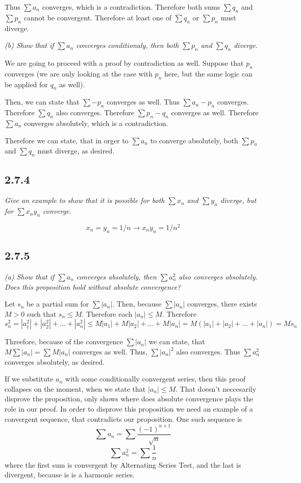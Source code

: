 \documentclass[11pt,oneside,titlepage]{book}
\begin{document}
Thus $\sum a_n$ converges, which is a contradiction. Therefore both
sums $\sum q_n$ and $\sum p_n$ cannot be convergent. Therefore at least one of
$\sum q_n$ or $\sum p_n$ must diverge.

\textit{(b) Show that if $\sum a_n$ converges conditionaly, then both
  $\sum p_n$ and $\sum q_n$ diverge.}

We are going to proceed with a proof by contradiction as well. Suppose that
$p_n$ converges (we are only looking at the case with $p_n$ here, but the
same logic can be applied for $q_n$ as well).

Then, we can state that $\sum -p_n$ converges as well. Thus $\sum a_n - p_n$
converges. Therefore $\sum q_n$ also converges. Therefore $\sum p_n - q_n$
converges as well. Therefore $\sum a_n$ converges absolutely, which is a
contradiction.

Therefore we can state, that in orger to $\sum a_n$ to converge absolutely,
both $\sum p_n$ and $\sum q_n$ must diverge, as desired.

\subsection*{2.7.4}
\textit{Give an example to show that it is possible for both $\sum x_n$ and
  $\sum y_n$ diverge, but for $\sum x_n y_n$ converge.}

$$x_n = y_n = 1/n \to x_n y_n = 1/n^2$$

\subsection*{2.7.5}
\textit{(a) Show that if $\sum a_n$ converges absolutely, then $\sum a_n^2$
  also converges absolutely. Does this proposition hold without absolute
  convergence?}

Let $s_n$ be a partial sum for $\sum |a_n|$. Then, because $\sum |a_n|$
converges, there exists $M > 0$ such that $s_n \leq M$. Therefore
each $|a_n| \leq M$. Therefore
$$s_n^2 = |a_1^2| + |a_2^2| + ... + |a_n^2| \leq M|a_1| + M|a_2| + ... +
M|a_n| = M(|a_1| + |a_2| + ... + |a_n|) = Ms_n$$

Threefore, because of the convergence $\sum |a_n|$ we can state, that
$M\sum |a_n| = \sum M |a_n|$ converges as well. Thus, $\sum |a_n|^2$ also
converges. Thus $\sum a_n^2$ converges absolutely, as desired.

If we substitute $a_n$ with some conditionally convergent series, then
this proof collapses on the moment, when we state that $|a_n| \leq M$. That
doesn't neccesarily disprove the proposition, only shows where does
absolute convergence plays the role  in our proof. In order to disprove
this proposition we need an example of a convergent sequence, that contradicts
our proposition. One such sequence is
$$\sum a_n = \sum \frac{(-1)^{n + 1}}{\sqrt{n}}$$
$$\sum a_n^2 = \sum \frac{1}{n}$$
where the first sum is convergent by Alternating Series Test, and the last
is divergent, because is is a harmonic series.
\end{document}
